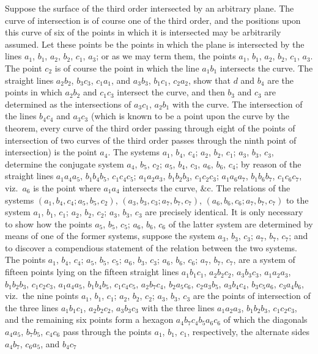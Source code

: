 \documentclass[11pt,a4paper]{book}
\begin{document}
Suppose the surface of the third order intersected by an arbitrary plane. The curve of intersection is of course one of the third order, and the positions upon this curve of six of the points in which it is intersected may be arbitrarily assumed. Let these points be the points in which the plane is intersected by the lines $a_{1}$, $b_{1}$, $a_{2}$, $b_{2}$, $c_{1}$, $a_{3}$; or as we may term them, the points $a_{1}$, $b_{1}$, $a_{2}$, $b_{2}$, $c_{1}$, $a_{3}$. The point $c_{2}$ is of course the point in which the line $a_{1}b_{1}$ intersects the curve. The straight lines $a_{2}b_{2}$, $b_{3}c_{3}$, $c_{1}a_{1}$, and $a_{3}b_{3}$, $b_{1}c_{1}$, $c_{2}a_{2}$, show that $d$ and $b_{4}$ are the points in which $a_{2}b_{2}$ and $c_{1}c_{3}$ intersect the curve, and then $b_{3}$ and $c_{3}$ are determined as the intersections of $a_{3}c_{1}$, $a_{2}b_{1}$ with the curve. The intersection of the lines $b_{4}c_{4}$ and $a_{3}c_{3}$ (which is known to be a point upon the curve by the theorem, every curve of the third order passing through eight of the points of intersection of two curves of the third order passes through the ninth point of intersection) is the point $a_{4}$. The systems $a_{1}$, $b_{4}$, $c_{4}$; $a_{2}$, $b_{2}$, $c_{1}$; $a_{3}$, $b_{3}$, $c_{3}$, determine the conjugate system $a_{4}$, $b_{5}$, $c_{2}$; $a_{5}$, $b_{4}$, $c_{3}$, $a_{6}$, $b_{6}$, $c_{4}$; by reason of the straight lines $a_{1}a_{4}a_{5}$, $b_{1}b_{4}b_{5}$, $c_{1}c_{4}c_{5}$; $a_{1}a_{2}a_{3}$, $b_{1}b_{2}b_{3}$, $c_{1}c_{2}c_{3}$; $a_{1}a_{6}a_{7}$, $b_{1}b_{6}b_{7}$, $c_{1}c_{6}c_{7}$, viz.\ $a_{6}$ is the point where $a_{1}a_{4}$ intersects the curve, \&c. The relations of the systems $(a_{1}, b_{4}, c_{4}; a_{5}, b_{5}, c_{2})$, $(a_{3}, b_{3}, c_{3}; a_{7}, b_{7}, c_{7})$, $(a_{6}, b_{6}, c_{6}; a_{7}, b_{7}, c_{7})$ to the system $a_{1}$, $b_{1}$, $c_{1}$; $a_{2}$, $b_{2}$, $c_{2}$; $a_{3}$, $b_{3}$, $c_{3}$ are precisely identical. It is only necessary to show how the points $a_{5}$, $b_{5}$, $c_{5}$; $a_{6}$, $b_{6}$, $c_{6}$ of the latter system are determined by means of one of the former systems, suppose the system $a_{3}$, $b_{3}$, $c_{3}$; $a_{7}$, $b_{7}$, $c_{7}$; and to discover a compendious statement of the relation between the two systems. The points $a_{1}$, $b_{4}$, $c_{4}$; $a_{5}$, $b_{5}$, $c_{5}$; $a_{6}$, $b_{3}$, $c_{3}$; $a_{6}$, $b_{6}$, $c_{6}$; $a_{7}$, $b_{7}$, $c_{7}$, are a system of fifteen points lying on the fifteen straight lines $a_{1}b_{1}c_{1}$, $a_{2}b_{2}c_{2}$, $a_{3}b_{3}c_{3}$, $a_{1}a_{2}a_{3}$, $b_{1}b_{2}b_{3}$, $c_{1}c_{2}c_{3}$, $a_{1}a_{4}a_{5}$, $b_{1}b_{4}b_{5}$, $c_{1}c_{4}c_{5}$, $a_{2}b_{7}c_{4}$, $b_{2}a_{5}c_{6}$, $c_{2}a_{3}b_{5}$, $a_{3}b_{4}c_{4}$, $b_{3}c_{5}a_{6}$, $c_{3}a_{4}b_{6}$, viz.\ the nine points $a_{1}$, $b_{1}$, $c_{1}$; $a_{2}$, $b_{2}$, $c_{2}$; $a_{3}$, $b_{3}$, $c_{3}$ are the points of intersection of the three lines $a_{1}b_{1}c_{1}$, $a_{2}b_{2}c_{2}$, $a_{3}b_{3}c_{3}$ with the three lines $a_{1}a_{2}a_{3}$, $b_{1}b_{2}b_{3}$, $c_{1}c_{2}c_{3}$, and the remaining six points form a hexagon $a_{4}b_{7}c_{4}b_{5}a_{6}c_{6}$ of which the diagonals $a_{4}a_{5}$, $b_{7}b_{5}$, $c_{4}c_{6}$ pass through the points $a_{1}$, $b_{1}$, $c_{1}$, respectively, the alternate sides $a_{4}b_{7}$, $c_{6}a_{5}$, and $b_{4}c_{7}$ 
\end{document}
